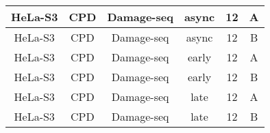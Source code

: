 \begin{table}[]
\begin{tabular}{cccccc}
    HeLa-S3           & CPD              & Damage-seq     & async            & 12            & A                  \\ \hline 
    HeLa-S3           & CPD              & Damage-seq     & async            & 12            & B                  \\ \hline 
    HeLa-S3           & CPD              & Damage-seq     & early            & 12            & A                  \\ \hline 
    HeLa-S3           & CPD              & Damage-seq     & early            & 12            & B                  \\ \hline 
    HeLa-S3           & CPD              & Damage-seq     & late             & 12            & A                  \\ \hline 
    HeLa-S3           & CPD              & Damage-seq     & late             & 12            & B \\
    \hline                
    \end{tabular}
    \end{table}

